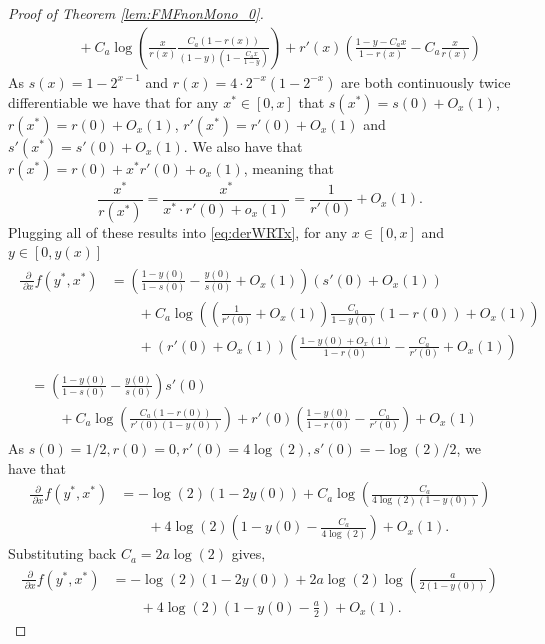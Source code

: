 \documentclass[12pt,reqno]{amsart}
\numberwithin{equation}{section}
\theoremstyle{definition}
\newcommand{\der}{\;\partial}
\renewcommand{\[}{\begin{equation}}
\renewcommand{\]}{\end{equation}}
\renewcommand{\|}{\bigg{|}}
\begin{document}
\begin{proof}[Proof of Theorem \ref{lem:FMFnonMono_0}]
\begin{align}
        &\qquad + C_a\log\left(\frac{x}{r(x)}\frac{C_a(1-r(x))}{(1-y)\left(1-\frac{C_a x}{1-y}\right)} \right) + r'(x)\left(\frac{1-y-C_a x}{1-r(x)} - C_a\frac{x}{r(x)} \right)\label{eq:derWRTx}
    \end{align}
    As $s(x) = 1-2^{x-1}$ and $r(x) = 4 \cdot 2^{-x}(1-2^{-x})$ are both continuously twice differentiable we have that for any $x^* \in [0,x]$ that $s(x^*) = s(0) + O_x(1)$, $r(x^*) = r(0) + O_x(1)$, $r'(x^*) = r'(0) + O_x(1)$ and $s'(x^*) = s'(0) + O_x(1)$. We also have that $r(x^*) = r(0) + x^*r'(0) + o_{x}(1)$, meaning that 
    \[\frac{x^*}{r(x^*)} = \frac{x^*}{x^* \cdot r'(0) + o_{x}(1)} = \frac{1}{r'(0)} + O_x(1).\]
    Plugging all of these results into \eqref{eq:derWRTx}, for any $x \in [0,x]$ and $y \in [0,y(x)]$
    \begin{align}\begin{split}\frac{\der}{\der x}f(y^*,x^*) &= \left(\frac{1-y(0)}{1-s(0)} - \frac{y(0)}{s(0)} + O_x(1)\right)(s'(0) + O_x(1)) \\
        &\qquad + C_a \log\left(\left(\frac{1}{r'(0)} + O_x(1)\right)\frac{C_a}{1-y(0)}(1-r(0)) + O_x(1) \right) \\
        &\qquad + (r'(0) + O_x(1))\left(\frac{1-y(0) + O_x(1)}{1-r(0)} - \frac{C_a}{r'(0)} + O_x(1) \right)\end{split}\\
        \begin{split}&= \left(\frac{1-y(0)}{1-s(0)} - \frac{y(0)}{s(0)}\right)s'(0)  \\
        &\qquad + C_a \log\left(\frac{C_a(1-r(0))}{r'(0)(1-y(0))}\right)+ r'(0)\left(\frac{1-y(0)}{1-r(0)} - \frac{C_a}{r'(0)}\right)+ O_x(1)\end{split}
        \end{align}
    As $s(0) = 1/2, r(0) = 0, r'(0) = 4\log(2), s'(0) = -\log(2)/2$, we have that
    \[\begin{split}
    \frac{\der}{\der x}f(y^*,x^*) &= -\log(2)\left(1-2y(0)\right)  + C_a \log\left(\frac{C_a}{4\log(2)(1-y(0))}\right)  \\
        &\qquad  + 4\log(2)\left(1-y(0) - \frac{C_a}{4\log(2)}\right) + O_x(1).
    \end{split}\]
    Substituting back $C_a = 2a\log(2)$ gives,
    \[\label{eq:derX}\begin{split}
        \frac{\der}{\der x}f(y^*,x^*) &= -\log(2)\left(1-2y(0)\right) + 2a\log(2) \log\left(\frac{a}{2(1-y(0))}\right)  \\
        &\qquad  + 4\log(2)\left(1 - y(0) - \frac{a}{2}\right) + O_x(1).

\end{split}\]
\end{proof}
\end{document}
